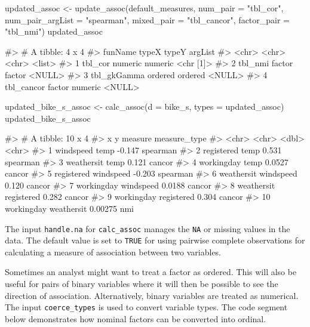 \begin{Schunk}
\begin{Sinput}
updated_assoc <- update_assoc(default_measures,
                              num_pair = "tbl_cor",
                              num_pair_argList = "spearman",
                              mixed_pair = "tbl_cancor",
                              factor_pair = "tbl_nmi")
updated_assoc
\end{Sinput}
\begin{Soutput}
#> # A tibble: 4 x 4
#>   funName     typeX   typeY   argList  
#>   <chr>       <chr>   <chr>   <list>   
#> 1 tbl_cor     numeric numeric <chr [1]>
#> 2 tbl_nmi     factor  factor  <NULL>   
#> 3 tbl_gkGamma ordered ordered <NULL>   
#> 4 tbl_cancor  factor  numeric <NULL>
\end{Soutput}
\begin{Sinput}
updated_bike_s_assoc <- calc_assoc(d = bike_s, 
                                 types = updated_assoc)
updated_bike_s_assoc
\end{Sinput}
\begin{Soutput}
#> # A tibble: 10 x 4
#>    x          y           measure measure_type
#>    <chr>      <chr>         <dbl> <chr>       
#>  1 windspeed  temp       -0.147   spearman    
#>  2 registered temp        0.531   spearman    
#>  3 weathersit temp        0.121   cancor      
#>  4 workingday temp        0.0527  cancor      
#>  5 registered windspeed  -0.203   spearman    
#>  6 weathersit windspeed   0.120   cancor      
#>  7 workingday windspeed   0.0188  cancor      
#>  8 weathersit registered  0.282   cancor      
#>  9 workingday registered  0.304   cancor      
#> 10 workingday weathersit  0.00275 nmi
\end{Soutput}
\end{Schunk}

The input \texttt{handle.na} for \texttt{calc\_assoc} manages the
\texttt{NA} or missing values in the data. The default value is set to
\texttt{TRUE} for using pairwise complete observations for calculating a
measure of association between two variables.

Sometimes an analyst might want to treat a factor as ordered. This will
also be useful for pairs of binary variables where it will then be
possible to see the direction of association. Alternatively, binary
variables are treated as numerical. The input \texttt{coerce\_types} is
used to convert variable types. The code segment below demonstrates how
nominal factors can be converted into ordinal.

